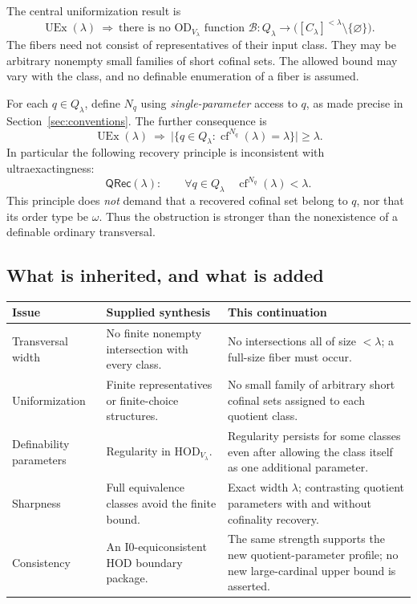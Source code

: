 \documentclass[11pt,letterpaper]{article}
\theoremstyle{definition}
\numberwithin{equation}{section}
\newcommand{\HOD}{\mathrm{HOD}}
\newcommand{\OD}{\mathrm{OD}}
\newcommand{\UEx}{\operatorname{UEx}}
\newcommand{\cf}{\operatorname{cf}}
\newcommand{\Izero}{\mathrm{I0}}
\newcommand{\Qlam}{Q_\lambda}
\newcommand{\Clam}{C_\lambda}
\newcommand{\QRec}{\mathsf{QRec}}
\begin{document}
The central uniformization result is
\begin{equation}\label{eq:main-family}
\UEx(\lambda)\ \Longrightarrow\
\text{there is no }\OD_{V_\lambda}\text{ function }
\mathcal B:\Qlam\longrightarrow
\bigl([\Clam]^{<\lambda}\setminus\{\varnothing\}\bigr).
\end{equation}
The fibers need not consist of representatives of their input class. They may be arbitrary nonempty small families of short cofinal sets. The allowed bound may vary with the class, and no definable enumeration of a fiber is assumed.

For each $q\in\Qlam$, define $N_q$ using \emph{single-parameter} access to $q$, as made precise in Section~\ref{sec:conventions}. The further consequence is
\begin{equation}\label{eq:main-hod}
\UEx(\lambda)\ \Longrightarrow\
\bigl|\{q\in\Qlam:\cf^{N_q}(\lambda)=\lambda\}\bigr|\ge\lambda.
\end{equation}
In particular the following recovery principle is inconsistent with ultraexactingness:
\begin{equation}\label{eq:qrec-intro}
\QRec(\lambda):\qquad
\forall q\in\Qlam\quad\cf^{N_q}(\lambda)<\lambda.
\end{equation}
This principle does \emph{not} demand that a recovered cofinal set belong to $q$, nor that its order type be $\omega$. Thus the obstruction is stronger than the nonexistence of a definable ordinary transversal.

\subsection{What is inherited, and what is added}

\begin{center}
\small
\renewcommand{\arraystretch}{1.18}
\begin{tabularx}{\textwidth}{@{}P{.25\textwidth}YY@{}}
\toprule
\textbf{Issue}&\textbf{Supplied synthesis}&\textbf{This continuation}\\\midrule
Transversal width&No finite nonempty intersection with every class.&No intersections all of size $<\lambda$; a full-size fiber must occur.\\
Uniformization&Finite representatives or finite-choice structures.&No small family of arbitrary short cofinal sets assigned to each quotient class.\\
Definability parameters&Regularity in $\HOD_{V_\lambda}$.&Regularity persists for some classes even after allowing the class itself as one additional parameter.\\
Sharpness&Full equivalence classes avoid the finite bound.&Exact width $\lambda$; contrasting quotient parameters with and without cofinality recovery.\\
Consistency&An $\Izero$-equiconsistent HOD boundary package.&The same strength supports the new quotient-parameter profile; no new large-cardinal upper bound is asserted.\\
\bottomrule
\end{tabularx}
\end{center}
\end{document}
